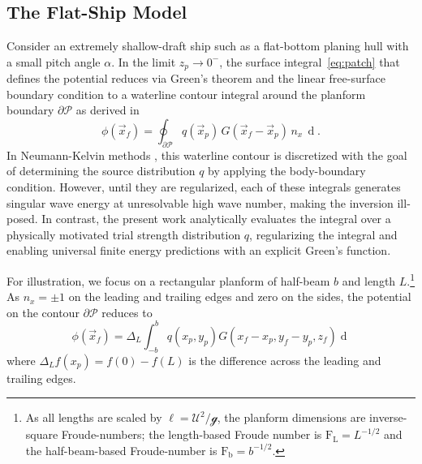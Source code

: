 \documentclass[]{JFM-FLM_Au}
\newcommand{\di}[1]{\mathop{\mathrm{d}#1}} %
\begin{document}
\subsection{The Flat-Ship Model}\label{ssec:flat_ship_model}

Consider an extremely shallow-draft ship such as a flat-bottom planing hull with a small pitch angle $\alpha$. In the limit $z_p\to 0^-$, the surface integral~\eqref{eq:patch} that defines the potential reduces via Green's theorem and the linear free-surface boundary condition to a waterline contour integral around the planform boundary $\partial\mathcal{P}$ as derived in \citep{noblesse_slender-ship_1983}
\[
\phi(\vec x_f) = \oint_{\partial\mathcal{P}} q(\vec x_p)\,G(\vec x_f-\vec x_p)\,n_x\,\di{y_p}.
\]
In Neumann-Kelvin methods \citep{baar_developments_1988}, this waterline contour is discretized with the goal of determining the source distribution $q$ by applying the body-boundary condition. However, until they are regularized, each of these integrals generates singular wave energy at unresolvable high wave number, making the inversion ill-posed. In contrast, the present work analytically evaluates the integral over a physically motivated trial strength distribution $q$, regularizing the integral and enabling universal finite energy predictions with an explicit Green's function.

For illustration, we focus on a rectangular planform of half-beam $b$ and length $L$.\footnote{As all lengths are scaled by $\ell=\mathscr{U}^2/\mathscr{g}$, the planform dimensions are inverse-square Froude-numbers; the length-based Froude number is $\mathrm{F_L}=L^{-1/2}$ and the half-beam-based Froude-number is $\mathrm{F_b}=b^{-1/2}$.} As $n_x = \pm 1$ on the leading and trailing edges and zero on the sides, the potential on the contour $\partial\mathcal{P}$ reduces to
\begin{equation}\label{eq:fs phi}
\phi(\vec x_f) = \Delta_L\int_{-b}^{b} q(x_p,y_p) G(x_f-x_p,y_f-y_p,z_f)\di{y_p}
\end{equation}
where $\Delta_L f(x_p) = f(0)-f(L)$ is the difference across the leading and trailing edges.
\end{document}

